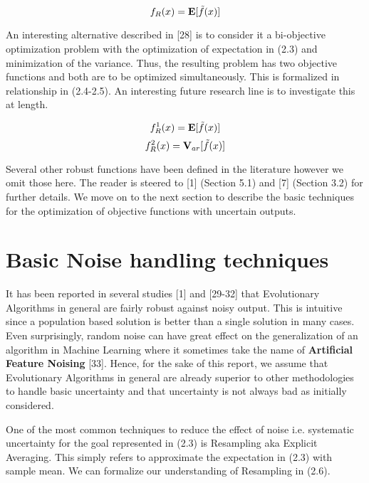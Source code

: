 \begin{equation}
f_{R}(x) = \textbf{E}[\Tilde{f}(x)]
\end{equation}

An interesting alternative described in [28] is to consider it a bi-objective optimization problem with the optimization of expectation in (2.3) and minimization of the variance. Thus, the resulting problem has two objective functions and both are to be optimized simultaneously. This is formalized in relationship in (2.4-2.5). An interesting future research line is to investigate this at length. 

\begin{equation}
f_{R}^1(x) = \textbf{E}[\Tilde{f}(x)] 
\end{equation}
\begin{equation}
f_{R}^2(x) = \textbf{V}_{ar}[\Tilde{f}(x)] 
\end{equation}

Several other robust functions have been defined in the literature however we omit those here. The reader is steered to [1] (Section 5.1)  and [7] (Section 3.2) for further details. We move on to the next section to describe the basic techniques for the optimization of objective functions with uncertain outputs.

\section {Basic Noise handling techniques}

It has been reported in several studies [1] and [29-32] that Evolutionary Algorithms in general are fairly robust against noisy output. This is intuitive since a population based solution is better than a single solution in many cases. Even surprisingly, random noise can have great effect on the generalization of an algorithm in Machine Learning where it sometimes take the name of \textbf{Artificial Feature Noising} [33]. Hence, for the sake of this report, we assume that Evolutionary Algorithms in general are already superior to other methodologies to handle basic uncertainty and that uncertainty is not always bad as initially considered. 

One of the most common techniques to reduce the effect of noise i.e. systematic uncertainty for the goal represented in (2.3) is Resampling aka Explicit Averaging. This simply refers to approximate the expectation in (2.3) with sample mean. We can formalize our understanding of Resampling in (2.6). 


